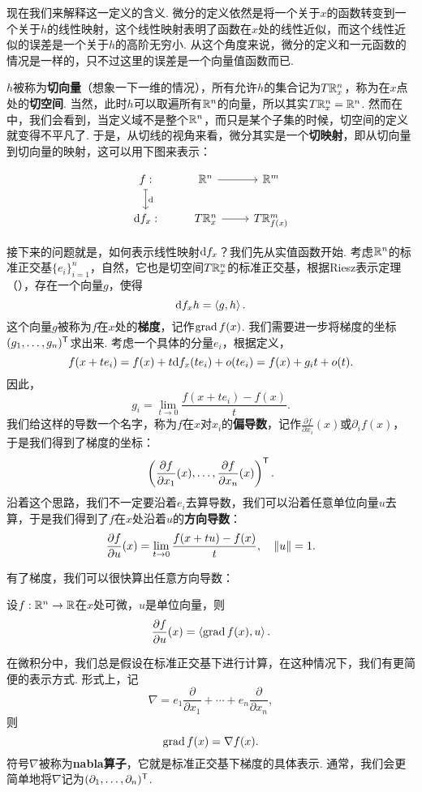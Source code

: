 现在我们来解释这一定义的含义. 微分的定义依然是将一个关于$x$的函数转变到一个关于$h$的线性映射，这个线性映射表明了函数在$x$处的线性近似，而这个线性近似的误差是一个关于$h$的高阶无穷小. 从这个角度来说，微分的定义和一元函数的情况是一样的，只不过这里的误差是一个向量值函数而已. 

$h$被称为\textbf{切向量}（想象一下一维的情况），所有允许$h$的集合记为$T\mathbb{R}_x^n$，称为在$x$点处的\textbf{切空间}. 当然，此时$h$可以取遍所有$\mathbb{R}^n$的向量，所以其实$T\mathbb{R}_x^n=\mathbb{R}^n$. 然而在中，我们会看到，当定义域不是整个$\mathbb{R}^n$，而只是某个子集的时候，切空间的定义就变得不平凡了. 于是，从切线的视角来看，微分其实是一个\textbf{切映射}，即从切向量到切向量的映射，这可以用下图来表示：

\[\begin{tikzcd} f:\arrow[mapsto, d, "\d"] & \R^n\arrow[r, ""] & \R^m \\
\d f_x: & T\R^n_x \arrow[r, ""] & T\R^m_{f(x)}
\end{tikzcd}\]

接下来的问题就是，如何表示线性映射$\mathrm{d} f_x$？我们先从实值函数开始. 考虑$\mathbb{R}^n$的标准正交基$\{e_i\}_{i=1}^n$，自然，它也是切空间$T\mathbb{R}^n_x$的标准正交基，根据Riesz表示定理（），存在一个向量$g$，使得
\[
    \mathrm{d} f_x h=\left\langle{g},{h}\right\rangle.
\]
这个向量$g$被称为$f$在$x$处的\textbf{梯度}，记作$\operatorname*{grad} f(x)$. 我们需要进一步将梯度的坐标$(g_1,\dots,g_n)^{\mathsf{T}}$求出来. 考虑一个具体的分量$e_i$，根据定义，
\[f(x+te_i)=f(x)+t\mathrm{d} f_x(te_i)+o(te_i)=f(x)+g_it+o(t).\]
因此，
\[g_i=\lim_{t\to 0}\frac{f(x+te_i)-f(x)}{t}.\]
我们给这样的导数一个名字，称为$f$在$x$对$x_i$的\textbf{偏导数}，记作$\frac{\partial f}{\partial x_i}(x)$或$\partial_i f(x)$，于是我们得到了梯度的坐标：
\[\left(\frac{\partial f}{\partial x_1}(x),\dots,\frac{\partial f}{\partial x_n}(x)\right)^{\mathsf{T}}.\]
沿着这个思路，我们不一定要沿着$e_i$去算导数，我们可以沿着任意单位向量$u$去算，于是我们得到了$f$在$x$处沿着$u$的\textbf{方向导数}：
\[\frac{\partial f}{\partial u}(x)=\lim_{t\to 0}\frac{f(x+tu)-f(x)}{t},\quad\left\|u\right\|=1.\]

有了梯度，我们可以很快算出任意方向导数：

\begin{proposition}\label{prop:directional-derivative}
    设$f:\mathbb{R}^n\to\mathbb{R}$在$x$处可微，$u$是单位向量，则
    \[\frac{\partial f}{\partial u}(x)=\left\langle{\operatorname*{grad}f(x)},{u}\right\rangle.\]
\end{proposition}
在微积分中，我们总是假设在标准正交基下进行计算，在这种情况下，我们有更简便的表示方式. 形式上，记
\[\nabla =e_1\frac{\partial }{\partial x_1}+\cdots+e_n\frac{\partial }{\partial x_n},\]
则
\[\operatorname*{grad} f(x)=\nabla f(x).\]
符号$\nabla$被称为\textbf{nabla算子}，它就是标准正交基下梯度的具体表示. 通常，我们会更简单地将$\nabla $记为$(\partial_1 ,\dots,\partial_n)^{\mathsf{T}}$. 


